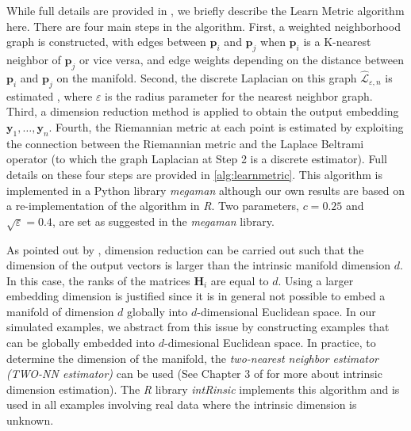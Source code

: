 \documentclass[12pt]{article}
\begin{document}
While full details are provided in \textcite{Perrault-Joncas2013-pq}, we briefly describe the Learn Metric algorithm here. There are four main steps in the algorithm. First, a weighted neighborhood graph is constructed, with edges between \(\bm{p}_i\) and \(\bm{p}_j\) when \(\bm{p}_i\) is a K-nearest neighbor of \(\bm{p}_j\) or vice versa, and edge weights depending on the distance between \(\bm{p}_i\) and \(\bm{p}_j\) on the manifold. Second, the discrete Laplacian on this graph \(\hat{\mathcal{L}}_{\varepsilon,n}\) is estimated \autocite{Zhou2011-za}, where \(\varepsilon\) is the radius parameter for the nearest neighbor graph. Third, a dimension reduction method is applied to obtain the output embedding \(\bm{y}_1,\dots,\bm{y}_n\). Fourth, the Riemannian metric at each point is estimated by exploiting the connection between the Riemannian metric and the Laplace Beltrami operator (to which the graph Laplacian at Step 2 is a discrete estimator). Full details on these four steps are provided in \autoref{alg:learnmetric}. This algorithm is implemented in a Python library \emph{megaman} \autocite{McQueen2016-xz} although our own results are based on a re-implementation of the algorithm in \emph{R}. Two parameters, \(c=0.25\) and \(\sqrt{\varepsilon} = 0.4\), are set as suggested in the \emph{megaman} library.

As pointed out by \textcite{Perrault-Joncas2013-pq}, dimension reduction can be carried out such that the dimension of the output vectors is larger than the intrinsic manifold dimension \(d\). In this case, the ranks of the matrices \(\bm{H}_i\) are equal to \(d\). Using a larger embedding dimension is justified since it is in general not possible to embed a manifold of dimension \(d\) globally into \(d\)-dimensional Euclidean space. In our simulated examples, we abstract from this issue by constructing examples that can be globally embedded into \(d\)-dimesional Euclidean space. In practice, to determine the dimension of the manifold, the \emph{two-nearest neighbor estimator (TWO-NN estimator)} \autocite{Facco2017-rl,Denti2021-jl} can be used (See Chapter 3 of \textcite{Lee2007-wq} for more about intrinsic dimension estimation). The \emph{R} library \emph{intRinsic} \autocite{Denti2021-qc} implements this algorithm and is used in all examples involving real data where the intrinsic dimension is unknown.
\end{document}
